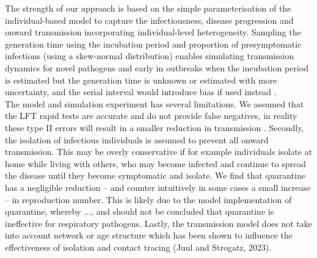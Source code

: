 \documentclass{article}
\begin{document}
The strength of our approach is based on the simple parameterisation of the individual-based model to capture the infectiousness, disease progression and onward transmission incorporating individual-level heterogeneity. Sampling the generation time using the incubation period and proportion of presymptomatic infections (using a skew-normal distribution) enables simulating transmission dynamics for novel pathogens and early in outbreaks when the incubation period is estimated but the generation time is unknown or estimated with more uncertainty, and the serial interval would introduce bias if used instead \citep{brittonEstimationEmergingEpidemics2019a, lehtinenRelationshipSerialInterval2021}. \\

The model and simulation experiment has several limitations. We assumed that the LFT rapid tests are accurate and do not provide false negatives, in reality these type II errors will result in a smaller reduction in transmission \citep{petoCOVID19RapidAntigen2021}. Secondly, the isolation of infectious individuals is assumed to prevent all onward transmission. This may be overly conservative if for example individuals isolate at home while living with others, who may become infected and continue to spread the disease until they become symptomatic and isolate. We find that quarantine has a negligible reduction -- and counter intuitively in some cases a small increase -- in reproduction number. This is likely due to the model implementation of quarantine, whereby ..., and should not be concluded that quarantine is ineffective for respiratory pathogens. Lastly, the transmission model does not take into account network or age structure which has been shown to influence the effectiveness of isolation and contact tracing (Juul and Strogatz, 2023). \\
\end{document}
